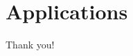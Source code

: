 \documentclass[pdf]{beamer}
\begin{document}


\section{Applications}

\begin{frame}
\tableofcontents[currentsection]
\end{frame}


\begin{frame}
\centering
Thank you!
\end{frame}
\end{document}
